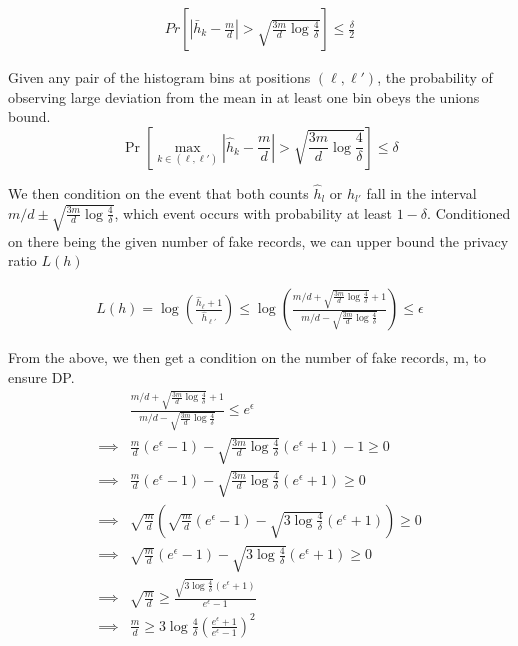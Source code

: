 \documentclass[11pt]{article}
\begin{document}
 \begin{align}
 Pr \left [ \left | \bar{h}_k - \frac{m}{d} \right | >  \sqrt{  \frac{3m}{d} \log{\frac{4}{\delta}} } \right ]  \le \frac{\delta}{2}
\end{align}

Given any pair of the histogram bins at positions $(\ell,\ell')$, the probability of observing large deviation from the mean in at least one bin obeys the unions bound.
\[
\Pr \left [ \max_{k \in (\ell,\ell')} \left | \hat{h}_k - \frac{m}{d} \right | >  \sqrt{  \frac{3m}{d} \log{\frac{4}{\delta}} } \right ]  \le \delta
\]

We then condition on the event that both counts $\hat{h}_l$ or $\hat{h}_{l'}$ fall in the interval $m/d \pm \sqrt{  \frac{3m}{d} \log{\frac{4}{\delta}}}$, which event occurs with probability at least $1 - \delta$.  
Conditioned on there being the given number of fake records, we can upper bound the privacy ratio $L(h)$

 \begin{align}
 L(h) =  \log  \left ( \frac{\hat{h}_\ell + 1}{\hat{h}_{\ell'}} \right ) \le \log  \left ( \frac{ m/d + \sqrt{  \frac{3m}{d} \log{\frac{4}{\delta}}} + 1}{  m/d - \sqrt{  \frac{3m}{d} \log{\frac{4}{\delta}}} } \right ) \le \epsilon 
\end{align}

From the above, we then get a condition on the number of fake records, m, to ensure DP.
 \begin{align*}
& \frac{ m/d + \sqrt{  \frac{3m}{d} \log{\frac{4}{\delta}}} + 1}{  m/d - \sqrt{  \frac{3m}{d} \log{\frac{4}{\delta}}}} \le e^\epsilon  \\
\implies & \frac{m}{d} (e^\epsilon - 1) -  \sqrt{  \frac{3m}{d} \log{\frac{4}{\delta}}} (e^\epsilon +1) - 1 \ge 0 \\
\implies & \frac{m}{d} (e^\epsilon - 1) -  \sqrt{  \frac{3m}{d} \log{\frac{4}{\delta}}} (e^\epsilon +1) \ge 0 \\
\implies &\sqrt{  \frac{m}{d}} \left ( \sqrt{  \frac{m}{d}} (e^\epsilon - 1)  - \sqrt{  3 \log{\frac{4}{\delta}}} (e^\epsilon +1) \right ) \ge 0 \\
\implies &\sqrt{  \frac{m}{d}} (e^\epsilon - 1)  - \sqrt{  3 \log{\frac{4}{\delta}}} (e^\epsilon +1)  \ge 0 \\
\implies &\sqrt{  \frac{m}{d}}  \ge  \frac { \sqrt{  3 \log{\frac{4}{\delta}}} (e^\epsilon +1)  } { e^\epsilon - 1 } \\
\implies & \frac{m}{d}  \ge 3\log {\frac{4}{\delta}} \left ( \frac{e^\epsilon +1}{e^\epsilon - 1} \right )^2
\end{align*}
\end{document}
